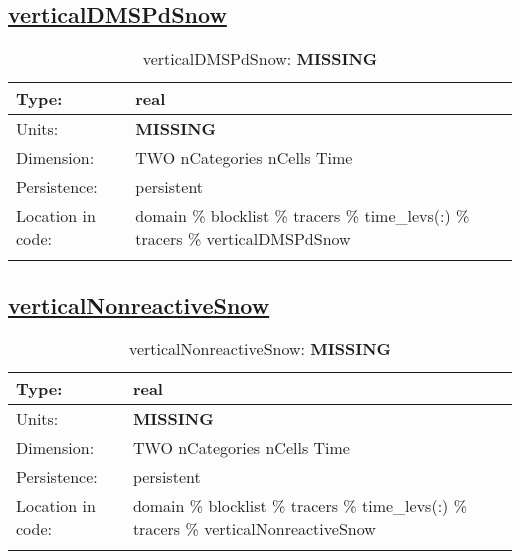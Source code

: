 \subsection[verticalDMSPdSnow]{\hyperref[sec:var_tab_tracers]{verticalDMSPdSnow}}
\label{subsec:var_sec_tracers_verticalDMSPdSnow}
\begin{center}
\begin{longtable}{| p{2.0in} | p{4.0in} |}
        \hline 
        Type: & real \\
        \hline 
        Units: & {\bf \color{red} MISSING} \\
        \hline 
        Dimension: & TWO nCategories nCells Time \\
        \hline 
        Persistence: & persistent \\
        \hline 
         Location in code: & domain \% blocklist \% tracers \% time\_levs(:) \% tracers \% verticalDMSPdSnow \\
         \hline 
    \caption{verticalDMSPdSnow: {\bf \color{red} MISSING}}
\end{longtable}
\end{center}
\subsection[verticalNonreactiveSnow]{\hyperref[sec:var_tab_tracers]{verticalNonreactiveSnow}}
\label{subsec:var_sec_tracers_verticalNonreactiveSnow}
\begin{center}
\begin{longtable}{| p{2.0in} | p{4.0in} |}
        \hline 
        Type: & real \\
        \hline 
        Units: & {\bf \color{red} MISSING} \\
        \hline 
        Dimension: & TWO nCategories nCells Time \\
        \hline 
        Persistence: & persistent \\
        \hline 
         Location in code: & domain \% blocklist \% tracers \% time\_levs(:) \% tracers \% verticalNonreactiveSnow \\
         \hline 
    \caption{verticalNonreactiveSnow: {\bf \color{red} MISSING}}
\end{longtable}
\end{center}
